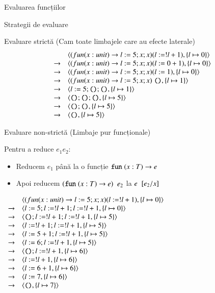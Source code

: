 \documentclass[xcolor=pdftex,romanian,colorlinks]{beamer}
\begin{document}
\begin{section}{Evaluarea funcțiilor}
\begin{subsection}{Strategii de evaluare}
\begin{frame}{Evaluare strictă (Cam toate limbajele care au efecte laterale)}
\[\begin{array}{ll}
& {\langle{(fun (x : unit) \rightarrow l := 5 ; x ; x) (l := !l + 1), \{l \mapsto 0\}}\rangle} \\
\rightarrow& {\langle{(fun (x : unit) \rightarrow l := 5 ; x ; x) (l := 0 + 1), \{l \mapsto 0\}}\rangle} \\
\rightarrow& {\langle{(fun (x : unit) \rightarrow l := 5 ; x ; x) (l := 1), \{l \mapsto 0\}}\rangle} \\
\rightarrow& {\langle{(fun (x : unit) \rightarrow l := 5 ; x ; x) \ensuremath\mathrel{\text{\ttfamily ()}}, \{l \mapsto 1\}}\rangle} \\
\rightarrow& {\langle{l := 5 ; \ensuremath\mathrel{\text{\ttfamily ()}}; \ensuremath\mathrel{\text{\ttfamily ()}}, \{l \mapsto 1\}}\rangle} \\
\rightarrow& {\langle{\ensuremath\mathrel{\text{\ttfamily ()}}; \ensuremath\mathrel{\text{\ttfamily ()}}; \ensuremath\mathrel{\text{\ttfamily ()}}, \{l \mapsto 5\}}\rangle} \\
\rightarrow& {\langle{\ensuremath\mathrel{\text{\ttfamily ()}}; \ensuremath\mathrel{\text{\ttfamily ()}}, \{l \mapsto 5\}}\rangle} \\
\rightarrow& {\langle{\ensuremath\mathrel{\text{\ttfamily ()}}, \{l \mapsto 5\}}\rangle} \\
\end{array}\]

\end{frame}


\begin{frame}{Evaluare non-strictă (Limbaje pur funcționale)} 
\begin{block}{}
Pentru a reduce $e_1 \mathrel{} e_2$:
\begin{itemize}
\item  Reducem $e_1$ până la o funcție $\mathrel{\text{\ttfamily fun}} (x : T) \rightarrow e$
\item Apoi reducem $(\mathrel{\text{\ttfamily fun}} (x : T) \rightarrow e) \mathrel{}e_2$ la $e\mathrel{}[e_2/x]$
\end{itemize}
\end{block}

\hfill $\begin{array}{ll}
& {\langle{(fun (x : unit) \rightarrow l := 5 ; x ; x) (l := !l + 1), \{l \mapsto 0\}}\rangle} \\
\rightarrow& {\langle{l := 5 ; l := !l + 1 ; l := !l + 1, \{l \mapsto 0\}}\rangle} \\
\rightarrow& {\langle{\ensuremath\mathrel{\text{\ttfamily ()}}; l := !l + 1 ; l := !l + 1, \{l \mapsto 5\}}\rangle} \\
\rightarrow& {\langle{l := !l + 1 ; l := !l + 1, \{l \mapsto 5\}}\rangle} \\
\rightarrow& {\langle{l := 5 + 1 ; l := !l + 1, \{l \mapsto 5\}}\rangle} \\
\rightarrow& {\langle{l := 6 ; l := !l + 1, \{l \mapsto 5\}}\rangle} \\
\rightarrow& {\langle{\ensuremath\mathrel{\text{\ttfamily ()}}; l := !l + 1, \{l \mapsto 6\}}\rangle} \\
\rightarrow& {\langle{l := !l + 1, \{l \mapsto 6\}}\rangle} \\
\rightarrow& {\langle{l := 6 + 1, \{l \mapsto 6\}}\rangle} \\
\rightarrow& {\langle{l := 7, \{l \mapsto 6\}}\rangle} \\
\rightarrow& {\langle{\ensuremath\mathrel{\text{\ttfamily ()}}, \{l \mapsto 7\}}\rangle}
\end{array}$ \hfill\;


\end{frame}
\end{subsection}
\end{section}
\end{document}
